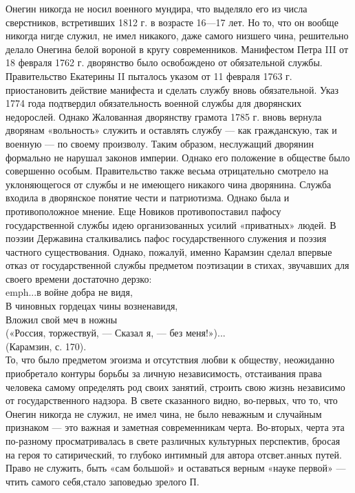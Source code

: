  Онегин никогда не носил военного мундира, что выделяло его из числа сверстников, встретивших 1812 г. в возрасте 16—17 лет. 
Но то, что он вообще никогда нигде служил, не имел никакого, даже самого низшего чина, решительно делало Онегина белой вороной в кругу современников.
Манифестом Петра III от 18 февраля 1762 г. дворянство было освобождено от обязательной службы. 
Правительство Екатерины II пыталось указом от 11 февраля 1763 г. приостановить действие манифеста и сделать службу вновь обязательной. Указ 1774 года подтвердил обязательность военной службы для дворянских недорослей. Однако Жалованная дворянству грамота 1785 г. вновь вернула дворянам «вольность» служить и оставлять службу — как гражданскую, так и военную — по своему произволу.
Таким образом, неслужащий дворянин формально не нарушал законов империи. Однако его положение 
в обществе было совершенно особым. Правительство также весьма отрицательно смотрело на уклоняющегося от службы и не имеющего никакого 
чина дворянина. Служба входила в дворянское понятие чести и патриотизма. 
Однако была и противоположное мнение. Еще Новиков противопоставил пафосу государственной службы идею организованных усилий «приватных» людей. В поэзии Державина сталкивались пафос государственного служения и поэзия частного существования. Однако, пожалуй, именно Карамзин сделал впервые отказ от 
государственной службы предметом поэтизации в стихах, звучавших для своего времени достаточно дерзко:
 \\emph{...в войне добра не видя,\\
 В чиновных гордецах чины возненавидя,\\
 Вложил свой меч в ножны\\
 («Россия, торжествуй, — Сказал я, — без меня!»)...\\
 (Карамзин, с. 170).}\\
 То, что было предметом эгоизма и отсутствия любви к обществу, неожиданно приобретало контуры борьбы за личную независимость, отстаивания права человека самому определять род своих занятий, строить свою жизнь независимо от государственного надзора.  
 В свете сказанного видно, во-первых, что то, что Онегин никогда не служил, не имел чина, не было 
неважным и случайным признаком — это важная и заметная современникам черта. Во-вторых, черта эта по-разному просматривалась в свете различных культурных перспектив, бросая на героя то сатирический, 
то глубоко интимный для автора отсвет.анных путей. 
Право не служить, быть «сам большой» и оставаться верным «науке первой» — чтить самого себя,стало заповедью зрелого П. 
